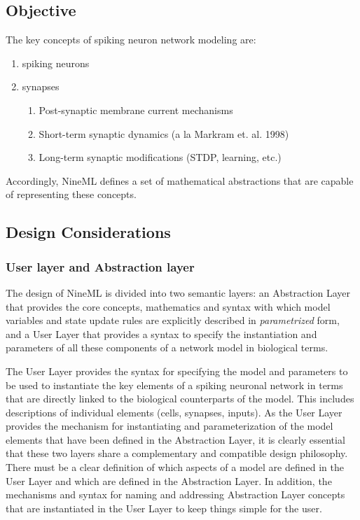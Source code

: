 \documentclass{article}
\begin{document}
\subsection{Objective}

The key concepts of spiking neuron network modeling are:

\begin{enumerate}
\item spiking neurons
\item synapses
\begin{enumerate}
\item Post-synaptic membrane current mechanisms
\item Short-term synaptic dynamics (a la Markram et. al. 1998)
\item Long-term synaptic modifications (STDP, learning, etc.)
\end{enumerate}
\end{enumerate}

Accordingly, NineML defines a set of mathematical abstractions that
are capable of representing these concepts.

\subsection{Design Considerations}

\subsubsection{User layer and Abstraction layer}

The design of NineML is divided into two semantic layers: an Abstraction
Layer that provides the core concepts, mathematics and syntax with which
model variables and state update rules are explicitly described in
{\em parametrized} form, and a User Layer that provides a syntax to specify
the instantiation and parameters of all these components of a network model
in biological terms.

The User Layer provides the syntax for specifying the model and parameters to
be used to instantiate the key elements of a spiking neuronal network in terms
that are directly linked to the biological counterparts of the model. This
includes descriptions of individual elements (cells, synapses, inputs).
As the User Layer provides the mechanism for instantiating and
parameterization of the model elements that have been defined in the
Abstraction Layer, it is clearly essential that these two layers share
a complementary and compatible design philosophy. There must be a
clear definition of which aspects of a model are defined in the User
Layer and which are defined in the Abstraction Layer. In addition, the
mechanisms and syntax for naming and addressing Abstraction Layer
concepts that are instantiated in the User Layer to keep things simple
for the user.
\end{document}
